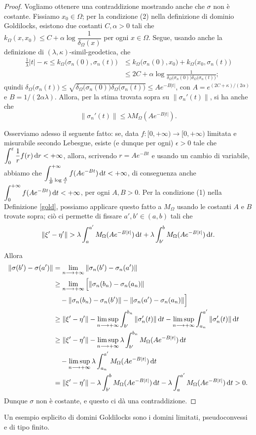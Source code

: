 \begin{proof}
    Vogliamo ottenere una contraddizione mostrando anche che $\sigma$ non è costante. Fissiamo $x_0\in\Omega$; per la condizione (2) nella definizione di dominio Goldilocks, esistono due costanti $C,\alpha>0$ tali che $k_\Omega(x,x_0) \le C+\alpha\log{\dfrac{1}{\delta_\Omega(x)}}$ per ogni $x\in\Omega$. Segue, usando anche la definizione di $(\lambda,\kappa)$-simil-geodetica, che
    \begin{align*}
        \frac{1}{\lambda}|t|-\kappa \le k_\Omega\big(\sigma_n(0),\sigma_n(t)\big) &\le k_\Omega\big(\sigma_n(0),x_0\big)+k_\Omega\big(x_0,\sigma_n(t)\big)\\
        &\le 2C+\alpha\log{\frac{1}{\delta_\Omega\big(\sigma_n(0)\big)\delta_\Omega\big(\sigma_n(t)\big)}};
    \end{align*}
    quindi $\delta_\Omega\big(\sigma_n(t)\big) \le \sqrt{\delta_\Omega\big(\sigma_n(0)\big)\delta_\Omega\big(\sigma_n(t)\big)} \le Ae^{-B|t|}$, con $A=e^{(2C+\kappa)/(2\alpha)}$ e $B=1/(2\alpha\lambda)$. Allora, per la stima trovata sopra su $\|\sigma_n'(t)\|$, si ha anche che
    $$\|\sigma_n'(t)\| \le \lambda M_\Omega(Ae^{-B|t|}).$$
    
    Osserviamo adesso il seguente fatto: se, data $f:[0,+\infty)\longrightarrow[0,+\infty)$ limitata e misurabile secondo Lebesgue, esiste (e dunque per ogni) $\epsilon>0$ tale che $\displaystyle \int_0^\varepsilon \frac{1}{r}f(r)\mathop{}\!\mathrm{d} r<+\infty$, allora, scrivendo $r=Ae^{-Bt}$ e usando un cambio di variabile, abbiamo che $\displaystyle\int_{\frac{1}{B}\log\frac{A}{\varepsilon}}^{+\infty} f(Ae^{-Bt})\mathop{}\!\mathrm{d} t<+\infty$, di conseguenza anche $\displaystyle\int_0^{+\infty} f(Ae^{-Bt})\mathop{}\!\mathrm{d} t<+\infty$, per ogni $A,B>0$. Per la condizione (1) nella Definizione \ref{gold}, possiamo applicare questo fatto a $M_\Omega$ usando le costanti $A$ e $B$ trovate sopra; ciò ci permette di fissare $a',b'\in(a,b)$ tali che
    $$\|\xi'-\eta'\|>\lambda\int_a^{a'} M_\Omega(Ae^{-B|t|})\diff t+\lambda\int_{b'}^b M_\Omega(Ae^{-B|t|})\diff t.$$

    Allora
    \begin{align*}
        \|\sigma(b')-\sigma(a')\|&=\lim_{n\longrightarrow+\infty}\|\sigma_n(b')-\sigma_n(a')\| \\
        & \ge \lim_{n\longrightarrow+\infty}\Big[\|\sigma_n(b_n)-\sigma_n(a_n)\|\\
        &\quad-\|\sigma_n(b_n)-\sigma_n(b')\|-\|\sigma_n(a')-\sigma_n(a_n)\|\Big] \\
        &\ge \|\xi'-\eta'\|-\limsup_{n\longrightarrow+\infty}\int_{b'}^{b_n}\|\sigma_n'(t)\|\mathop{}\!\mathrm{d} t-\limsup_{n\longrightarrow+\infty}\int_{a_n}^{a'}\|\sigma_n'(t)\|\mathop{}\!\mathrm{d} t\\
        &\ge \|\xi'-\eta'\|-\limsup_{n\longrightarrow+\infty}\lambda\int_{b'}^{b_n}M_\Omega(Ae^{-B|t|})\mathop{}\!\mathrm{d} t\\
        &\quad-\limsup_{n\longrightarrow+\infty}\lambda\int_{a_n}^{a'}M_\Omega(Ae^{-B|t|})\mathop{}\!\mathrm{d} t\\
        &=\|\xi'-\eta'\|-\lambda\int_{b'}^b M_\Omega(Ae^{-B|t|})\mathop{}\!\mathrm{d} t-\lambda\int_a^{a'}M_\Omega(Ae^{-B|t|})\mathop{}\!\mathrm{d} t>0.
    \end{align*}
    Dunque $\sigma$ non è costante, e questo ci dà una contraddizione.
\end{proof}

Un esempio esplicito di domini Goldilocks sono i domini limitati, pseudoconvessi e di tipo finito.